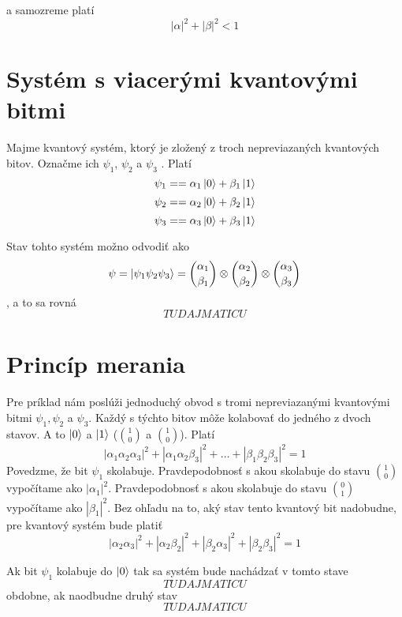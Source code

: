a samozreme platí
\[|\alpha|^{2} + |\beta|^{2} < 1\]

\section{Systém s viacerými kvantovými bitmi}
Majme kvantový systém, ktorý je zložený z troch nepreviazaných kvantových bitov.
Označme ich \(\psi_1\), \(\psi_2\) a \(\psi_3\) . Platí
\[\psi_1 = = \alpha_1 \Ket{0} + \beta_1 \Ket{1}\]
\[\psi_2 = = \alpha_2 \Ket{0} + \beta_2 \Ket{1}\]
\[\psi_3 = = \alpha_3 \Ket{0} + \beta_3 \Ket{1}\]

Stav tohto systém možno odvodiť ako
\[\psi = \Ket{\psi_1 \psi_2 \psi_3} = \binom{\alpha_1}{\beta_1} \otimes \binom{\alpha_2}{\beta_2} \otimes \binom{\alpha_3}{\beta_3}\]
, a to sa rovná
\[TU DAJ MATICU\]

\section{Princíp merania}
Pre príklad nám poslúži jednoduchý obvod s tromi nepreviazanými kvantovými 
bitmi \(\psi_1, \psi_2\) a \(\psi_3\). Každý s týchto bitov môže kolabovať do
jedného z dvoch stavov. A to \(\Ket{0}\) a \(\Ket{1}\) (\(\binom{1}{0}\) a
\(\binom{1}{0}\)). Platí
\[|\alpha_1\alpha_2\alpha_3|^2 + |\alpha_1\alpha_2\beta_3|^2 + \dots + |\beta_1\beta_2\beta_3|^2 = 1\]
Povedzme, že bit \(\psi_1\) skolabuje. Pravdepodobnosť s akou skolabuje do
stavu \(\binom{1}{0}\) vypočítame ako \(|\alpha_1|^2\). Pravdepodobnosť s akou 
skolabuje do stavu \(\binom{0}{1}\) vypočítame ako \(|\beta_1|^2\). Bez ohľadu
na to, aký stav tento kvantový bit nadobudne, pre kvantový systém bude platiť
\[|\alpha_2\alpha_3|^2 + |\alpha_2\beta_2|^2 + |\beta_2\alpha_3|^2 + |\beta_2\beta_3|^2 = 1\]

Ak bit \(\psi_1\) kolabuje do \(\Ket{0}\) tak sa systém bude nachádzať v tomto
stave
\[TU DAJ MATICU\]
obdobne, ak naodbudne druhý stav
\[TU DAJ MATICU\]
